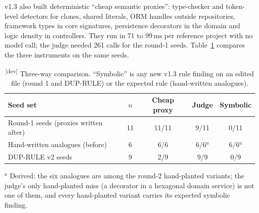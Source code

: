 \documentclass[10pt,a4paper]{article}
\newcommand{\devset}{\textsuperscript{\textsf{\tiny[dev]}}}
\begin{document}
v1.3 also built deterministic ``cheap semantic proxies'': type-checker and token-level detectors for clones, shared
literals, ORM handles outside repositories, framework types in core signatures, persistence decorators in the
domain and logic density in controllers. They run in 71 to 99\,ms per reference project with no model call; the
judge needed 261 calls for the round-1 seeds. %
Table~\ref{tab:threeway} compares the three instruments on the same seeds.

\begin{table}[t]
\centering\small
\caption{\devset{} Three-way comparison. ``Symbolic'' is any new v1.3 rule finding on an edited file (round 1 and
DUP-RULE) or the expected rule (hand-written analogues).}
\label{tab:threeway}
\begin{tabular}{lcccc}
\toprule
Seed set & $n$ & Cheap proxy & Judge & Symbolic \\
\midrule
Round-1 seeds (proxies written after) & 11 & 11/11 & 9/11 & 0/11 \\
Hand-written analogues (before) & 6 & 6/6 & 6/6$^{a}$ & 6/6$^{a}$ \\
DUP-RULE v2 seeds & 9 & 2/9 & 9/9 & 0/9 \\
\bottomrule
\end{tabular}

\smallskip\footnotesize $^{a}$ Derived: the six analogues are among the round-2 hand-planted variants; the judge's
only hand-planted miss (a decorator in a hexagonal domain service) is not one of them, and every hand-planted
variant carries its expected symbolic finding.
\end{table}
\end{document}
